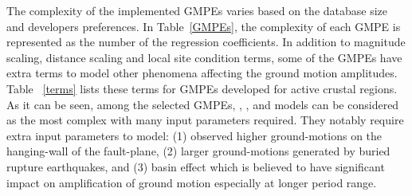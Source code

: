 The complexity of the implemented GMPEs varies based on the database
size and developers preferences. In Table~\ref{GMPEs}, the
complexity of each GMPE is represented as the number of the
regression coefficients. In addition to magnitude scaling, distance
scaling and local site condition terms, some of the GMPEs have extra
terms to model other phenomena affecting the ground motion
amplitudes. Table ~\ref{terms} lists these terms for GMPEs developed
for active crustal regions. As it can be seen, among the selected
GMPEs, \citet{eqrm_Abrahamson08}, \citet{eqrm_Campbell08}, and
\citet{eqrm_Chiou08} models can be considered as the most complex
with many input parameters required. They notably require extra
input parameters to model: (1) observed higher ground-motions on the
hanging-wall of the fault-plane, (2) larger ground-motions generated
by buried rupture earthquakes, and (3) basin effect which is
believed to have significant impact on amplification of ground
motion especially at longer period range.
